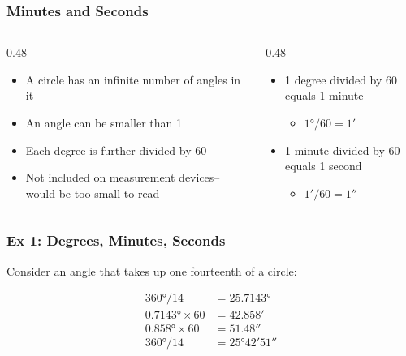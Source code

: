 \begin{frame}
	\frametitle{Minutes and Seconds}

    \begin{columns}[t]
        \begin{column}{0.48\linewidth}
            \begin{itemize}[<+- | alert@+>]
                \item A circle has an infinite number of angles in it
                \item An angle can be smaller than 1\textdegree{}
                \item Each degree is further divided by 60
                \item Not included on measurement devices--would be too small to read
            \end{itemize} 
        \end{column}
        \begin{column}{0.48\linewidth}
            \begin{itemize}[<+- | alert@+>]
                \item 1 degree divided by 60 equals 1 minute
                    \begin{itemize}
                        \item $\ang{1} / 60 = \ang{;1}$
                    \end{itemize}
                \item 1 minute divided by 60 equals 1 second
                    \begin{itemize}
                        \item $\ang{;1} / 60 = \ang{;;1}$
                    \end{itemize}
            \end{itemize} 
        \end{column}
    \end{columns}
\end{frame}

\begin{frame}
	\frametitle{Ex 1: Degrees, Minutes, Seconds}

    Consider an angle that takes up one fourteenth of a circle:

    \begin{align*}
        \ang{360} / 14 &= \ang{25.7143}\\
        \ang{0.7143} \times 60 &= \ang{;42.858}\\
        \ang{0.858} \times 60 &= \ang{;;51.48}\\
        \ang{360} / 14 &= \ang{25;42;51}
    \end{align*}
\end{frame}

